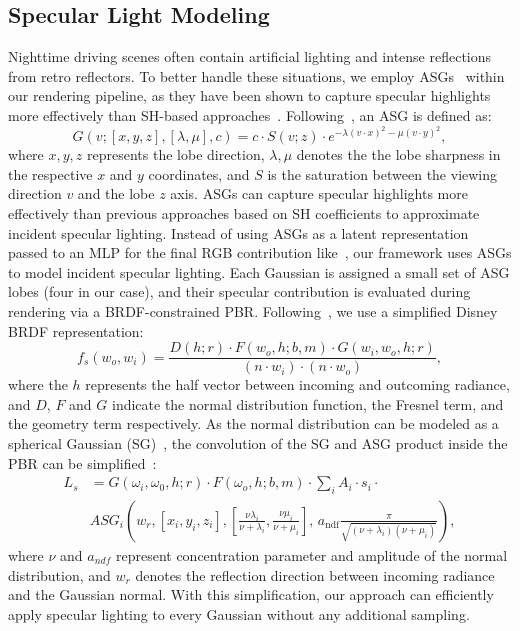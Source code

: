 \documentclass[letterpaper, 10 pt, conference]{ieeeconf}  %
\begin{document}
\subsection{Specular Light Modeling}
Nighttime driving scenes often contain artificial lighting and intense reflections from retro reflectors. To better handle these situations, we employ ASGs~\cite{xu2013anisotropic} within our rendering pipeline, as they have been shown to capture specular highlights more effectively than SH-based approaches~\cite{gao2024relightable}.
Following~\cite{xu2013anisotropic}, an ASG is defined as:
\begin{equation}
    G(v; [x, y, z], [\lambda, \mu], c) =
    c \cdot S(v; z) \cdot
    e^{-\lambda (v \cdot x)^2 - \mu (v \cdot y)^2},
\end{equation}
where $x, y, z$ represents the lobe direction, $\lambda, \mu$ denotes the the lobe sharpness in the respective $x$ and $y$ coordinates, and $S$ is the saturation between the viewing direction $v$ and the lobe $z$ axis.
%
ASGs can capture specular highlights more effectively than previous approaches based on SH coefficients to approximate incident specular lighting.
Instead of using ASGs as a latent representation passed to an MLP for the final RGB contribution like~\cite{yang2024spec},
our framework uses ASGs to model incident specular lighting. Each Gaussian is assigned a small set of ASG lobes (four in our case), and their specular contribution is evaluated during rendering via a BRDF-constrained PBR.
Following~\cite{yao2022neilf, gao2024relightable}, we use a simplified Disney BRDF representation:
\begin{equation}
    f_s(w_o, w_i) = \frac{D(h;r) \cdot F(w_o, h; b, m) \cdot G(w_i, w_o, h; r)}{(n \cdot w_i) \cdot (n \cdot w_o)},
    \label{Disney BRDF}
\end{equation}
where the $h$ represents the half vector between incoming and outcoming radiance, and $D$, $F$ and $G$ indicate the normal distribution function, the Fresnel term, and the geometry term respectively.
%
As the normal distribution can be modeled as a spherical Gaussian (SG)~\cite{gao2024relightable, yao2022neilf}, the convolution of the SG and ASG product inside the PBR can be simplified~\cite{xu2013anisotropic}:
\begin{equation}
\begin{split}
L_s &= G(\omega_i,\omega_0,h; r) \cdot F(\omega_o,h; b,m) \cdot \sum_{i} A_i \cdot s_i \cdot 
    \\ &ASG_i\!\left(w_r,[x_i,y_i,z_i], 
    \left[\tfrac{\nu\lambda_i}{\nu+\lambda_i}, \tfrac{\nu\mu_i}{\nu+\mu_i}\right],\,
    a_{\text{ndf}} \tfrac{\pi}{\sqrt{(\nu+\lambda_i)(\nu+\mu_i)}}\right),
\end{split}
\label{Simplified}
\end{equation}
where $\nu$ and $a_{ndf}$ represent concentration parameter and amplitude of the normal distribution, and $w_r$ denotes the reflection direction between incoming radiance and the Gaussian normal.
%
With this simplification, our approach can efficiently apply specular lighting to every Gaussian without any additional sampling. 
\end{document}
